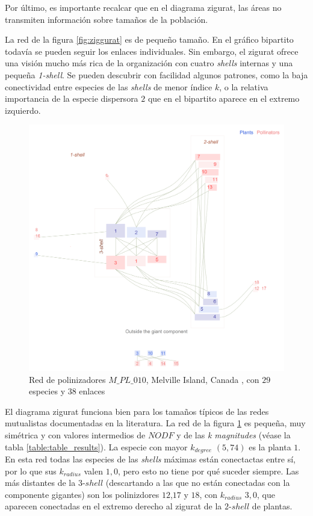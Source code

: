 Por último, es importante recalcar que en el diagrama zigurat, las áreas no transmiten información sobre tamaños de la población.

La red de la figura \ref{fig:ziggurat} es de pequeño tamaño. En el gráfico bipartito todavía se pueden seguir los enlaces individuales. Sin embargo, el zigurat ofrece una visión mucho más rica de la organización con cuatro \textit{shells} internas y una pequeña \textit{1-shell}. Se pueden descubrir con facilidad algunos patrones, como la baja conectividad entre especies de las \textit{shells} de menor índice $k$, o la relativa importancia de la especie dispersora $2$ que en el bipartito aparece en el extremo izquierdo.

\begin{figure}[ht!]
\centering
\includegraphics[scale=0.16]{Figures/VIS_zig_pl_024.png}
\caption {Red de polinizadores $M\_PL\_010$, Melville Island, Canada \cite{mosquin1967observations}, con $29$ especies y $38$ enlaces}
\label{fig:VIS_zig_pl_024}
\end{figure}

El diagrama zigurat funciona bien para los tamaños típicos de las redes mutualistas documentadas en la literatura. La red de la figura \ref{fig:VIS_zig_pl_024} es pequeña, muy simétrica y con valores intermedios de $NODF$ y de las \textit{k magnitudes} (véase la tabla \ref{table:table_results}). La especie con mayor $k_{degree}$ $(5,74)$ es la planta $1$. En esta red todas las especies de las \textit{shells} máximas están conectactas entre sí, por lo que sus $k_{radius}$ valen $1,0$, pero esto no tiene por qué suceder siempre. Las más distantes de la $3$-$shell$ (descartando a las que no están conectadas con la componente gigantes) son los polinizdores $12$,$17$ y $18$, con  $k_{radius}$ $3,0$, que aparecen conectadas en el extremo derecho al zigurat de la $2$-$shell$ de plantas.


